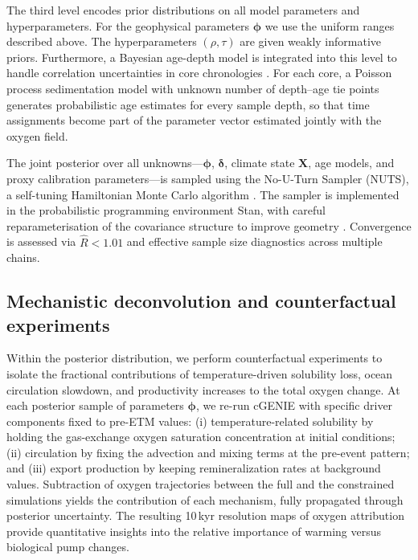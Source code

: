 \documentclass{article}
\begin{document}
The third level encodes prior distributions on all model parameters and hyperparameters. For the geophysical parameters $\boldsymbol{\phi}$ we use the uniform ranges described above. The hyperparameters $(\rho,\tau)$ are given weakly informative priors. Furthermore, a Bayesian age-depth model is integrated into this level to handle correlation uncertainties in core chronologies \cite{haslett2008bchron, blaaauw2011clam}. For each core, a Poisson process sedimentation model with unknown number of depth–age tie points generates probabilistic age estimates for every sample depth, so that time assignments become part of the parameter vector estimated jointly with the oxygen field.

The joint posterior over all unknowns—$\boldsymbol{\phi}$, $\boldsymbol{\delta}$, climate state $\mathbf{X}$, age models, and proxy calibration parameters—is sampled using the No-U-Turn Sampler (NUTS), a self-tuning Hamiltonian Monte Carlo algorithm \cite{hoffman2014nuts}. The sampler is implemented in the probabilistic programming environment Stan, with careful reparameterisation of the covariance structure to improve geometry \cite{carpenter2017stan}. Convergence is assessed via $\hat{R}<1.01$ and effective sample size diagnostics across multiple chains.

\subsection{Mechanistic deconvolution and counterfactual experiments}

Within the posterior distribution, we perform counterfactual experiments to isolate the fractional contributions of temperature-driven solubility loss, ocean circulation slowdown, and productivity increases to the total oxygen change. At each posterior sample of parameters $\boldsymbol{\phi}$, we re-run cGENIE with specific driver components fixed to pre-ETM values: (i) temperature-related solubility by holding the gas-exchange oxygen saturation concentration at initial conditions; (ii) circulation by fixing the advection and mixing terms at the pre-event pattern; and (iii) export production by keeping remineralization rates at background values. Subtraction of oxygen trajectories between the full and the constrained simulations yields the contribution of each mechanism, fully propagated through posterior uncertainty. The resulting 10\,kyr resolution maps of oxygen attribution provide quantitative insights into the relative importance of warming versus biological pump changes.
\end{document}
